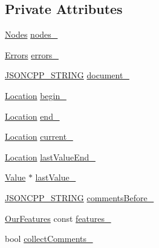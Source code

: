 \subsection*{Private Attributes}
\begin{DoxyCompactItemize}
\item 
\hyperlink{class_json_1_1_our_reader_a8480a5ef159cee3a090f96358414d8d3}{Nodes} \hyperlink{class_json_1_1_our_reader_a19cc4e8c5d17ee6822f752e9a36f4ce3}{nodes\+\_\+}
\item 
\hyperlink{class_json_1_1_our_reader_a8cc69593ef7303e58e99bb5dbb767562}{Errors} \hyperlink{class_json_1_1_our_reader_afb76b68ba1ab68fe09cf2838e3d4898d}{errors\+\_\+}
\item 
\hyperlink{json_8h_a1e723f95759de062585bc4a8fd3fa4be}{J\+S\+O\+N\+C\+P\+P\+\_\+\+S\+T\+R\+I\+NG} \hyperlink{class_json_1_1_our_reader_a726230af83d22d25e0c76cec3408ecf1}{document\+\_\+}
\item 
\hyperlink{class_json_1_1_our_reader_a1bdc7bbc52ba87cae6b19746f2ee0189}{Location} \hyperlink{class_json_1_1_our_reader_a9bda9d72335d52cd06e65f9eca3f70f5}{begin\+\_\+}
\item 
\hyperlink{class_json_1_1_our_reader_a1bdc7bbc52ba87cae6b19746f2ee0189}{Location} \hyperlink{class_json_1_1_our_reader_ab1f69b0260c27a0d2d65dc56e42c8f9d}{end\+\_\+}
\item 
\hyperlink{class_json_1_1_our_reader_a1bdc7bbc52ba87cae6b19746f2ee0189}{Location} \hyperlink{class_json_1_1_our_reader_a5211fbbba94be80a22dd2317c621efcc}{current\+\_\+}
\item 
\hyperlink{class_json_1_1_our_reader_a1bdc7bbc52ba87cae6b19746f2ee0189}{Location} \hyperlink{class_json_1_1_our_reader_a101eadc45e01c60628b53f0db3d13482}{last\+Value\+End\+\_\+}
\item 
\hyperlink{class_json_1_1_value}{Value} $\ast$ \hyperlink{class_json_1_1_our_reader_a9f994b6a2227c5d96e6ed6cbc74ed251}{last\+Value\+\_\+}
\item 
\hyperlink{json_8h_a1e723f95759de062585bc4a8fd3fa4be}{J\+S\+O\+N\+C\+P\+P\+\_\+\+S\+T\+R\+I\+NG} \hyperlink{class_json_1_1_our_reader_a9c53e77e290eb9081298210a955fda6a}{comments\+Before\+\_\+}
\item 
\hyperlink{class_json_1_1_our_features}{Our\+Features} const \hyperlink{class_json_1_1_our_reader_a2714302d5cc54ca2ce4118ea51c0397a}{features\+\_\+}
\item 
bool \hyperlink{class_json_1_1_our_reader_a259f6ac988da2894bcafc670e42f73ad}{collect\+Comments\+\_\+}
\end{DoxyCompactItemize}


